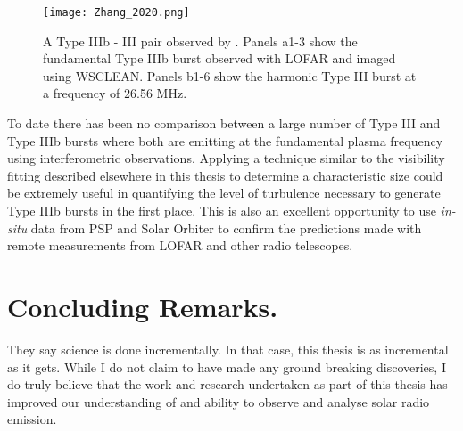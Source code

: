 \begin{figure}[ht]
\centering
\texttt{[image: Zhang\_2020.png]}
\caption[Type IIIb - III pair observed by \cite{Zhang2020}]{A Type IIIb - III pair observed by \cite{Zhang2020}. Panels a1-3 show the fundamental Type IIIb burst observed with LOFAR and imaged using WSCLEAN. Panels b1-6 show the harmonic Type III burst at a frequency of 26.56 MHz.  }
\label{fig:typeIIIbIII}
\end{figure}

To date there has been no comparison between a large number of Type III and Type IIIb bursts where both are emitting at the fundamental plasma frequency using interferometric observations. Applying a technique similar to the visibility fitting described elsewhere in this thesis to determine a characteristic size could be extremely useful in quantifying the level of turbulence necessary to generate Type IIIb bursts in the first place. This is also an excellent opportunity to use \textit{in-situ} data from PSP and Solar Orbiter to confirm the predictions made with remote measurements from LOFAR and other radio telescopes. 

\section{Concluding Remarks.}
They say science is done incrementally. In that case, this thesis is as incremental as it gets. While I do not claim to have made any ground breaking discoveries, I do truly believe that the work and research undertaken as part of this thesis has improved our understanding of and ability to observe and analyse solar radio emission.